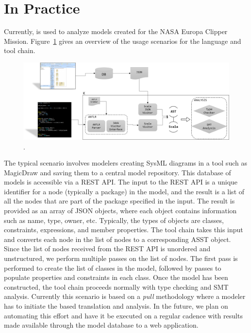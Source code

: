 \section{\Klang{} In Practice}
\label{sec:usage}

Currently, \Klang{} is used to analyze models created for the
NASA Europa Clipper Mission. Figure~\ref{fig:k} gives an overview of
the usage scenarios for the \Klang{} language and tool chain.

\begin{figure}
\centering
\includegraphics[scale=0.39]{K.png}
\caption{\Klang{}.}
\label{fig:k}
\end{figure}

The typical scenario involves modelers creating SysML diagrams in a
tool such as MagicDraw and saving them to a central model
repository. This database of models is accessible via a REST API. The
input to the REST API is a unique identifier for a node (typically a
\sysml{} package) in the model, and the result is a list of all the
nodes that are part of the package specified in the input. The result
is provided as an array of JSON objects, where each object contains
information such as name, type, owner, etc. Typically, the types of
objects are classes, constraints, expressions, and member
properties. The \Klang{} tool chain takes this input and converts each
node in the list of nodes to a corresponding \Klang{} ASST
object. Since the list of nodes received from the REST API is
unordered and unstructured, we perform multiple passes on
the list of nodes. The first pass is performed to create the list of
classes in the model, followed by passes to populate properties and
constraints in each class. Once the \Klang{} model has been
constructed, the \Klang{} tool chain proceeds normally with type
checking and SMT analysis. Currently this scenario is based on a {\em
  pull} methodology where a modeler has to initiate the \Klang{} based
translation and analysis. In the future, we plan on automating this
effort and have it be executed on a regular cadence with results made
available through the model database to a web application.

